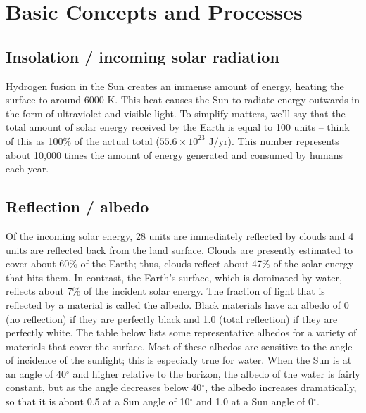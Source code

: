 \documentclass[11pt,letterpaper]{article}
\begin{document}
\section{Basic Concepts and Processes}
\subsection{Insolation / incoming solar radiation}
Hydrogen fusion in the Sun creates an immense amount of energy, heating the surface to around 6000 K. This heat causes the Sun to radiate energy outwards in the form of ultraviolet and visible light. To simplify matters, we'll say that the total amount of solar energy received by the Earth is equal to 100 units -- think of this as 100\% of the actual total ($55.6\times{10}^{23}\mbox{ J/yr}$). This number represents about 10,000 times the amount of energy generated and consumed by humans each year.

\subsection{Reflection / albedo}
Of the incoming solar energy, 28 units are immediately reflected by clouds and 4 units are reflected back from the land
surface. Clouds are presently estimated to cover about 60\% of the Earth; thus, clouds reflect about 47\% of the solar energy that hits them. In contrast, the Earth's surface, which is dominated by water, reflects about 7\% of the incident solar energy. The fraction of light that is reflected by a material is called the albedo. Black materials
have an albedo of 0 (no reflection) if they are perfectly black and 1.0 (total reflection) if they are perfectly white. The
table below lists some representative albedos for a variety of materials that cover the surface. Most of these albedos are sensitive to the
angle of incidence of the sunlight; this is especially true for water. When the Sun is at an angle of 40$^\circ$ and higher relative to the horizon, the albedo of the water is fairly constant, but as the angle decreases below 40$^\circ$, the albedo increases dramatically, so that it is about 0.5 at a Sun angle of 10$^\circ$ and 1.0 at a Sun angle of 0$^\circ$.
\end{document}

